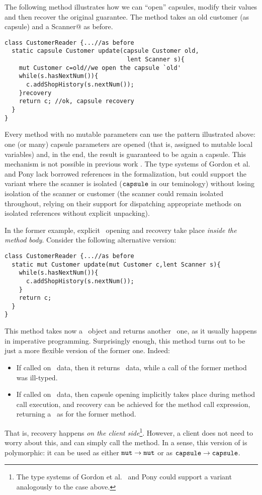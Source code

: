 {The following method \Q@update@ illustrates how we can ``open'' capsules, modify their values and then recover the original \Q@capsule@ guarantee. The} 
method  takes an old customer (as capsule) and a \Q@lent Scanner@ as before.
{%
\begin{lstlisting}
class CustomerReader {...//as before
  static capsule Customer update(capsule Customer old,
                                  lent Scanner s){
    mut Customer c=old//we open the capsule `old'
    while(s.hasNextNum()){
      c.addShopHistory(s.nextNum());
    }recovery
    return c; //ok, capsule recovery
  }
}
\end{lstlisting}
}
Every method {with no} mutable parameters can use the pattern illustrated above: one (or many) capsule parameters are opened  (that is, assigned to mutable local variables) and, in the end, the result is guaranteed to be again a capsule. {This mechanism is not possible in previous work \cite{Almeida97,ClarkeWrigstad03,DietlEtAl07}. The type systems of Gordon et al.~\cite{GordonEtAl12} and Pony \cite{ClebschEtAl15} lack borrowed references in the formalization, but could support the variant where the scanner is isolated ($\texttt{capsule}$ in our teminology) without losing isolation of the scanner or customer (the
 scanner could remain isolated throughout, relying on their support for dispatching appropriate
 methods on isolated references without explicit unpacking)}.


{In the former example, explicit \capsule\ opening and recovery take place \emph{inside the method body}.
Consider the following alternative version:}
\begin{lstlisting}
class CustomerReader {...//as before
  static mut Customer update(mut Customer c,lent Scanner s){
    while(s.hasNextNum()){
      c.addShopHistory(s.nextNum());
    }
    return c;
  }
}
\end{lstlisting}
{This method {takes now a \mutable\ object and returns} another \mutable\ one, as it usually happens in imperative programming.
Surprisingly enough, this method turns out to be just a more flexible version of the former one. Indeed:
\begin{itemize}
\item If called on \mutable\ data, then it returns \mutable\ data, while a call of the former method was ill-typed.
\item If called on \capsule\ data, then capsule opening implicitly takes place during method call execution, and recovery can be achieved for the method call expression, returning a \capsule\ as for the former method.
\end{itemize}
That is, recovery happens \emph{on the client side}\footnote{{The type systems  of Gordon et al.~\cite{GordonEtAl12} and Pony \cite{ClebschEtAl15} could support a variant analogously to the case above.}}. However, a client does not need to worry about this, and can simply call the method.
In a sense, this version of \Q@update@ is polymorphic: it can be used as either
$\texttt{mut}\rightarrow\texttt{mut}$ or as $\texttt{capsule}\rightarrow\texttt{capsule}$.}

